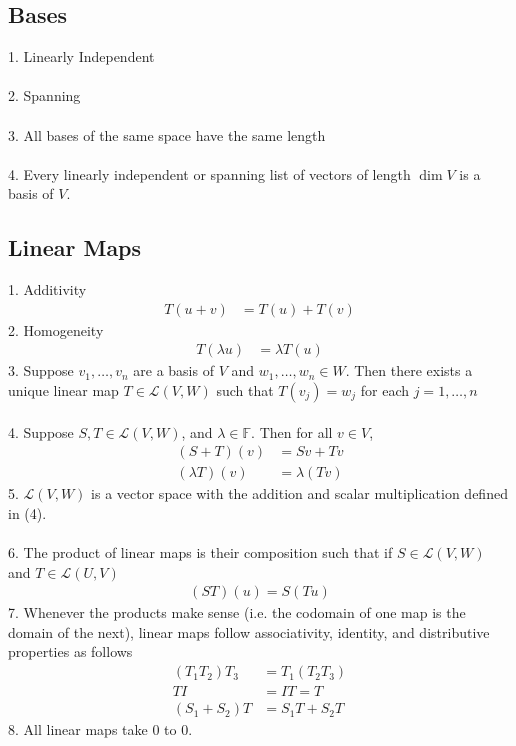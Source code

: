\documentclass[11pt,reqno]{article}
\newcommand{\F}{\mathbb{F}}
\theoremstyle{definition}
\begin{document}
\subsection*{Bases}
1. Linearly Independent\\\\
2. Spanning\\\\
3. All bases of the same space have the same length\\\\
4. Every linearly independent or spanning list of vectors of length $\dim V$ is a basis of $V$.

\subsection*{Linear Maps}
1. Additivity
\begin{align*}
    T(u + v) &= T(u) + T(v)
\end{align*}
2. Homogeneity
\begin{align*}
    T(\lambda u) &= \lambda T(u)
\end{align*}
3. Suppose $v_1,\ldots,v_n$ are a basis of $V$ and $w_1,\ldots,w_n\in W$. Then there exists a unique linear map $T\in\mathcal{L}(V, W)$ such that $T(v_j) = w_j$ for each $j = 1,\ldots,n$\\\\
4. Suppose $S,T\in\mathcal{L}(V, W)$, and $\lambda\in\F$. Then for all $v\in V$,
\begin{align*}
    (S + T)(v) &= Sv + Tv\\
    (\lambda T)(v) &= \lambda (Tv)
\end{align*}
5. $\mathcal{L}(V, W)$ is a vector space with the addition and scalar multiplication defined in (4).\\\\
6. The product of linear maps is their composition such that if $S\in\mathcal{L}(V, W)$ and $T\in\mathcal{L}(U, V)$
\begin{align*}
    (ST)(u) = S(Tu)
\end{align*}
7. Whenever the products make sense (i.e. the codomain of one map is the domain of the next), linear maps follow associativity, identity, and distributive properties as follows
\begin{align*}
    (T_1T_2)T_3 &= T_1(T_2T_3)\\
    TI &= IT = T\\
    (S_1 + S_2)T &= S_1T + S_2T
\end{align*}
8. All linear maps take $0$ to $0$.
\end{document}

